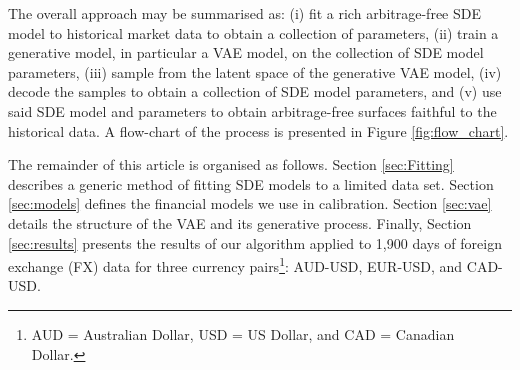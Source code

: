 \documentclass[onefignum,onetabnum]{siamonline190516}
\begin{document}
The overall approach may be summarised as: (i) fit a rich arbitrage-free SDE model to historical market data to obtain a collection of parameters, (ii) train a generative model, in particular a VAE model, on the collection of SDE model parameters, (iii) sample from the latent space of the generative VAE model, (iv) decode the samples to obtain a collection of SDE model parameters, and (v) use said SDE model and parameters to obtain arbitrage-free surfaces faithful to the historical data.  A flow-chart of the process is presented in Figure \ref{fig:flow_chart}.

The remainder of this article is organised as follows. Section \ref{sec:Fitting} describes a generic method of fitting SDE models to a limited data set. Section \ref{sec:models} defines the financial models we use in calibration. Section \ref{sec:vae} details the structure of the VAE and its generative process.  Finally, Section \ref{sec:results} presents the results of our algorithm applied to 1,900 days of foreign exchange (FX) data for three currency pairs\footnote{AUD = Australian Dollar, USD = US Dollar, and CAD = Canadian Dollar.}: AUD-USD, EUR-USD, and CAD-USD.

%
%
\end{document}
